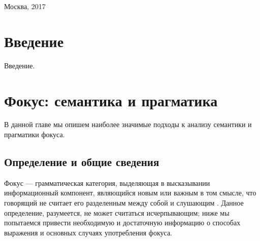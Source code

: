 \documentclass[a4paper, titlepage, 12pt]{article}
\begin{document}
\begin{titlepage}


{\large Москва, 2017} %


 


\end{titlepage}

\thispagestyle{empty} 
\tableofcontents
\thispagestyle{empty}

\clearpage


\section[Введение]{Введение}

Введение.

\setcounter{page}{1}

\section{Фокус: семантика и прагматика}

В данной главе мы опишем наиболее значимые подходы к анализу семантики и прагматики фокуса. 

\subsection{Определение и общие сведения}

Фокус --- грамматическая категория, выделяющая в высказывании информационный компонент, являющийся новым или важным в том смысле, что говорящий не считает его разделенным между собой и слушающим \citep{Jackendoff1972}. Данное определение, разумеется, не может считаться исчерпывающим; ниже мы попытаемся привести необходимую и достаточную информацию о способах выражения и основных случаях употребления фокуса.
\end{document}

